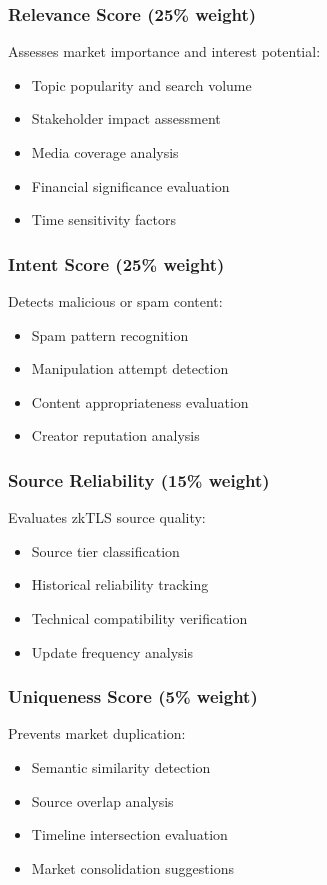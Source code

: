 \documentclass[11pt,a4paper]{article}
\begin{document}
\subsubsection{Relevance Score (25\% weight)}
Assesses market importance and interest potential:
\begin{itemize}
    \item Topic popularity and search volume
    \item Stakeholder impact assessment
    \item Media coverage analysis
    \item Financial significance evaluation
    \item Time sensitivity factors
\end{itemize}

\subsubsection{Intent Score (25\% weight)}
Detects malicious or spam content:
\begin{itemize}
    \item Spam pattern recognition
    \item Manipulation attempt detection
    \item Content appropriateness evaluation
    \item Creator reputation analysis
\end{itemize}

\subsubsection{Source Reliability (15\% weight)}
Evaluates zkTLS source quality:
\begin{itemize}
    \item Source tier classification
    \item Historical reliability tracking
    \item Technical compatibility verification
    \item Update frequency analysis
\end{itemize}

\subsubsection{Uniqueness Score (5\% weight)}
Prevents market duplication:
\begin{itemize}
    \item Semantic similarity detection
    \item Source overlap analysis
    \item Timeline intersection evaluation
    \item Market consolidation suggestions
\end{itemize}
\end{document}
